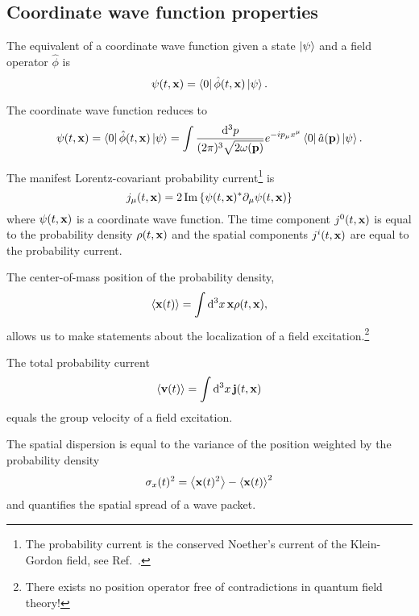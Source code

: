 \subsection{Coordinate wave function properties}

\begin{definition}
	The equivalent of a coordinate wave function given a state $\ket{\psi}$ and a field operator $\hat\phi$ is
	\begin{equation}
		\psi(t,\vb{x})
		=
		\bra{0}\hat\phi(t,\vb{x})\ket{\psi}
		.
	\end{equation}
\end{definition}
\begin{lemma}\label{thm:coordinate_wave_function_simplified}
	The coordinate wave function reduces to
	\begin{equation}
		\psi(t,\vb{x})
		=
		\bra{0}\hat\phi(t,\vb{x})\ket{\psi}
		=
		\int\frac{\dd[3]{p}}{(2\pi)^3\sqrt{2\omega(\vb{p})}}
		e^{-ip_\mu x^\mu}
		\bra{0}
		\hat{a}(\vb{p})
		\ket{\psi}
		.
	\end{equation}
\end{lemma}
\begin{definition}
	The manifest Lorentz-covariant probability current\footnote{The probability current is the conserved Noether's current of the Klein-Gordon field, see Ref.~\cite[p.~18]{Peskin1995}.} is
	\begin{equation}
		j_\mu(t,\vb{x})
		=
		2
		\operatorname{\operatorname{Im}}\left\{
			\psi(t,\vb{x})^*
			\partial_\mu
			\psi(t,\vb{x})
		\right\}
		\label{eq:qkg_probability_current}
	\end{equation}
	where $\psi(t,\vb{x})$ is a coordinate wave function.
	The time component $j^0(t,\vb{x})$ is equal to the probability density $\rho(t,\vb{x})$ and the spatial components $j^i(t,\vb{x})$ are equal to the probability current.
\end{definition}
\begin{definition}[Localization]
	The center-of-mass position of the probability density,
	\begin{equation}
		\expval{\vb{x}(t)}
		=
		\int\dd[3]{x}
		\vb{x}
		\rho(t,\vb{x})
		,
	\end{equation}
	allows us to make statements about the localization of a field excitation.\footnote{There exists no position operator free of contradictions in quantum field theory!}
\end{definition}
\begin{definition}
	The total probability current
	\begin{equation}
		\expval{\vb{v}(t)}
		=
		\int\dd[3]{x}
		\vb{j}(t,\vb{x})
		\label{eq:group_velocity}
	\end{equation}
	equals the group velocity of a field excitation.
\end{definition}
\begin{definition}
	The spatial dispersion is equal to the variance of the position weighted by the probability density
	\begin{equation}
		\sigma_x(t)^2
		=
		\expval{\vb{x}(t)^2}
		-
		\expval{\vb{x}(t)}^2
	\end{equation}
	and quantifies the spatial spread of a wave packet.
\end{definition}